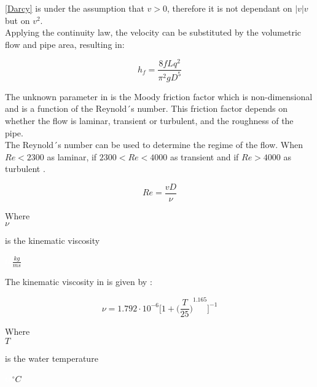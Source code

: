 \eqref{Darcy} is under the assumption that $v>0$, therefore it is not dependant on $|v|v$ but on $v^2$. \\
Applying the continuity law, the velocity can be substituted by the volumetric flow and pipe area, resulting in:

\begin{equation}
  h_f = \frac{8fLq^2}{\pi^{2}gD^5}
  \label{DarcyWeisbach}
\end{equation} 
 
 The unknown parameter in  is the Moody friction factor 
 which is non-dimensional and is a function of the Reynold´s number. This friction factor depends on whether the flow is laminar, transient or turbulent, and the roughness of the pipe. \\
 
 
The Reynold´s number can be used to determine the regime of the flow. When $Re<2300$ as laminar, if $2300<Re<4000$ as transient and if
$Re>4000$ as turbulent \cite{Intro_Fluid}. 

\begin{equation}
   Re = \frac{vD}{\nu}
   \label{Reynolds}
 \end{equation}
 
  \begin{minipage}[t]{0.20\textwidth}
Where\\
\hspace*{8mm} $\nu$ 
\end{minipage}
\begin{minipage}[t]{0.68\textwidth}
\vspace*{2mm}
is the kinematic viscosity

\end{minipage}
\begin{minipage}[t]{0.10\textwidth}
\vspace*{2mm}
\textcolor{White}{te}$\unit{\frac{kg}{ms}}$
\end{minipage}

The kinematic viscosity in \cite{Design_Water} is given by :

\begin{equation}
  \nu = 1.792 \cdot 10^{-6} \bigg[1+{\bigg(\frac{T}{25}\bigg)}^{1.165} \bigg]^{-1}
\end{equation}

  \begin{minipage}[t]{0.20\textwidth}
Where\\
\hspace*{8mm} $T$ 
\end{minipage}
\begin{minipage}[t]{0.68\textwidth}
\vspace*{2mm}
is the water temperature  
 \end{minipage}
\begin{minipage}[t]{0.10\textwidth}
\vspace*{2mm}
\textcolor{White}{te}$\unit{^{\circ} C}$
\end{minipage}

